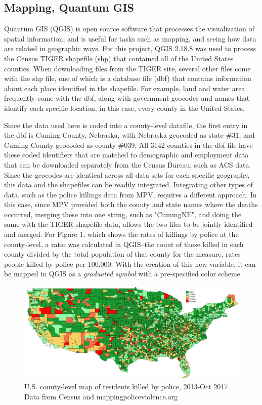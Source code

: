 \documentclass[sigconf]{acmart}
\begin{document}
\subsection{Mapping, Quantum GIS}
Quantum GIS (QGIS) is open source software that processes the visualization of spatial information, and is useful for tasks such as mapping, and seeing how data are related in geographic ways. \cite{qgis} For this project, QGIS 2.18.8 was used to process the Census TIGER shapefile (shp) that contained all of the United States counties.  When downloading files from the TIGER site, several other files come with the shp file, one of which is a database file (dbf) that contains information about each place identified in the shapefile.  For example, land and water area frequently come with the dbf, along with government geocodes and names that identify each specific location, in this case, every county in the United States. 

Since the data used here is coded into a county-level datafile, the first entry in the dbf is Cuming County, Nebraska, with Nebraska geocoded as state \#31, and Cuming County geocoded as county \#039.  All 3142 counties in the dbf file have these coded identifiers that are matched to demographic and employment data that can be downloaded separately from the Census Bureau, such as ACS data.  Since the geocodes are identical across all data sets for each specific geography, this data and the shapefiles can be readily integrated.  Integrating other types of data, such as the police killings data from MPV, requires a different approach.  In this case, since MPV provided both the county and state names where the deaths occurred, merging these into one string, such as "CumingNE", and doing the same with the TIGER shapefile data, allows the two files to be jointly identified and merged.  For Figure 1, which shows the rates of killings by police at the county-level, a ratio was calculated in QGIS--the count of those killed in each county divided by the total population of that county for the measure, rates people killed by police per 100,000.  With the creation of this new variable, it can be mapped in QGIS as a {\em graduated symbol} with a pre-specified color scheme. 

\begin{figure}
\includegraphics[width=1.0\textwidth]{images/figure1.jpg}
\caption{U.S. county-level map of residents killed by police, 2013-Oct 2017.  Data from Census and mappingpoliceviolence.org}
\end{figure}
\end{document}
